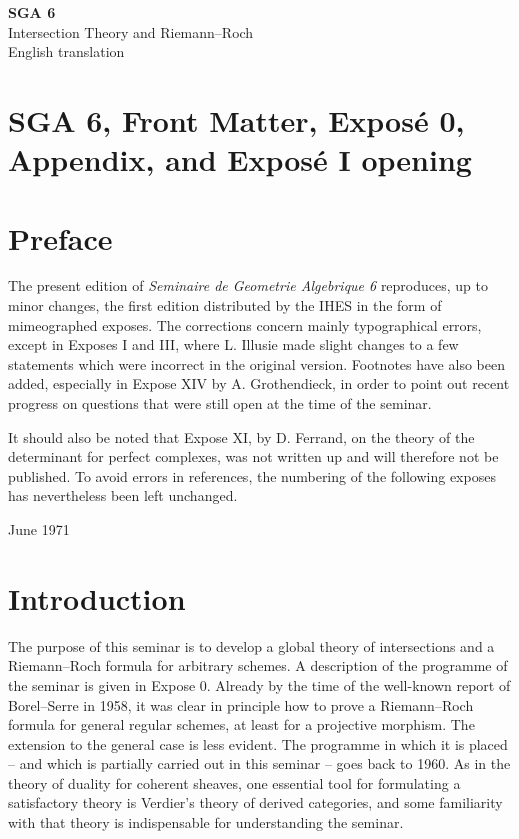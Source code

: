\documentclass[11pt]{article}
\theoremstyle{plain}
\theoremstyle{definition}
\theoremstyle{remark}
\begin{document}
\begin{titlepage}
\centering
\vspace*{2.3in}
{\LARGE\textbf{SGA 6}}\\[0.5em]
{\Large Intersection Theory and Riemann--Roch}\\[1.5em]
{\large English translation}
\vfill
\end{titlepage}
\tableofcontents


\clearpage
\section*{SGA 6, Front Matter, Exposé 0, Appendix, and Exposé I opening}


\newpage

\section*{Preface}

The present edition of \emph{Seminaire de Geometrie Algebrique 6} reproduces, up to minor changes, the first edition distributed by the IHES in the form of mimeographed exposes. The corrections concern mainly typographical errors, except in Exposes I and III, where L. Illusie made slight changes to a few statements which were incorrect in the original version. Footnotes have also been added, especially in Expose XIV by A. Grothendieck, in order to point out recent progress on questions that were still open at the time of the seminar.

It should also be noted that Expose XI, by D. Ferrand, on the theory of the determinant for perfect complexes, was not written up and will therefore not be published. To avoid errors in references, the numbering of the following exposes has nevertheless been left unchanged.

\begin{flushright}
June 1971
\end{flushright}

\section*{Introduction}

The purpose of this seminar is to develop a global theory of intersections and a Riemann--Roch formula for arbitrary schemes. A description of the programme of the seminar is given in Expose 0. Already by the time of the well-known report of Borel--Serre in 1958, it was clear in principle how to prove a Riemann--Roch formula for general regular schemes, at least for a projective morphism. The extension to the general case is less evident. The programme in which it is placed -- and which is partially carried out in this seminar -- goes back to 1960. As in the theory of duality for coherent sheaves, one essential tool for formulating a satisfactory theory is Verdier's theory of derived categories, and some familiarity with that theory is indispensable for understanding the seminar.
\end{document}

